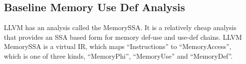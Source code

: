 \vspace{-10pt}
\subsection{Baseline Memory Use Def Analysis} 
\label{baseline-mem-def-analysis} 
LLVM has an analysis called the MemorySSA\cite{llvm-memoryssa-url}. 
It is a relatively cheap analysis that provides an SSA based form for 
memory def-use and use-def chains. 
LLVM MemorySSA is a virtual IR, which maps ``Instructions'' to ``MemoryAccess'', 
which is one of three kinds, ``MemoryPhi'', ``MemoryUse'' and ``MemoryDef''.

